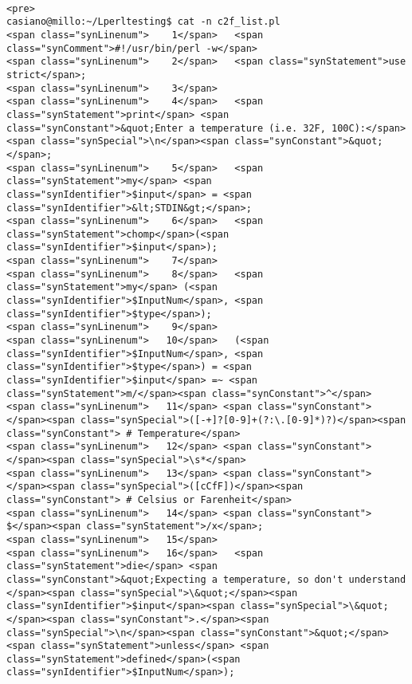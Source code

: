 \begin{verbatim}

<pre>
casiano@millo:~/Lperltesting$ cat -n c2f_list.pl
<span class="synLinenum">    1</span>   <span class="synComment">#!/usr/bin/perl -w</span>
<span class="synLinenum">    2</span>   <span class="synStatement">use strict</span>;
<span class="synLinenum">    3</span> 
<span class="synLinenum">    4</span>   <span class="synStatement">print</span> <span class="synConstant">&quot;Enter a temperature (i.e. 32F, 100C):</span><span class="synSpecial">\n</span><span class="synConstant">&quot;</span>;
<span class="synLinenum">    5</span>   <span class="synStatement">my</span> <span class="synIdentifier">$input</span> = <span class="synIdentifier">&lt;STDIN&gt;</span>;
<span class="synLinenum">    6</span>   <span class="synStatement">chomp</span>(<span class="synIdentifier">$input</span>);
<span class="synLinenum">    7</span> 
<span class="synLinenum">    8</span>   <span class="synStatement">my</span> (<span class="synIdentifier">$InputNum</span>, <span class="synIdentifier">$type</span>);
<span class="synLinenum">    9</span> 
<span class="synLinenum">   10</span>   (<span class="synIdentifier">$InputNum</span>, <span class="synIdentifier">$type</span>) = <span class="synIdentifier">$input</span> =~ <span class="synStatement">m/</span><span class="synConstant">^</span>
<span class="synLinenum">   11</span> <span class="synConstant">                                      </span><span class="synSpecial">([-+]?[0-9]+(?:\.[0-9]*)?)</span><span class="synConstant"> # Temperature</span>
<span class="synLinenum">   12</span> <span class="synConstant">                                      </span><span class="synSpecial">\s*</span>
<span class="synLinenum">   13</span> <span class="synConstant">                                      </span><span class="synSpecial">([cCfF])</span><span class="synConstant"> # Celsius or Farenheit</span>
<span class="synLinenum">   14</span> <span class="synConstant">                                   $</span><span class="synStatement">/x</span>;
<span class="synLinenum">   15</span> 
<span class="synLinenum">   16</span>   <span class="synStatement">die</span> <span class="synConstant">&quot;Expecting a temperature, so don't understand </span><span class="synSpecial">\&quot;</span><span class="synIdentifier">$input</span><span class="synSpecial">\&quot;</span><span class="synConstant">.</span><span class="synSpecial">\n</span><span class="synConstant">&quot;</span> <span class="synStatement">unless</span> <span class="synStatement">defined</span>(<span class="synIdentifier">$InputNum</span>);

\end{verbatim}
